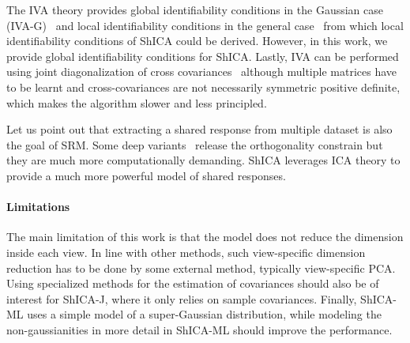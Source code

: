 
The IVA theory provides global identifiability conditions in the Gaussian case (IVA-G)~\cite{via2011joint} and local identifiability conditions in the general case~\cite{anderson2014independent} from which local identifiability conditions of ShICA could be derived. However, in this work, we provide global identifiability conditions for ShICA.
Lastly, IVA can be performed using joint diagonalization of cross covariances~\cite{li2011joint, congedo2012orthogonal} although multiple matrices have to be learnt and cross-covariances are not necessarily symmetric positive definite, which makes the algorithm slower and less principled.

Let us point out that extracting a shared response from multiple dataset is also
the goal of SRM. Some deep variants~\cite{chen2016convolutional} release the
orthogonality constrain but they are much more computationally demanding.
ShICA leverages ICA theory to provide a much more powerful model of shared responses.


\paragraph{Limitations}
The main limitation of this work is that the model does not reduce the dimension inside each view. In line with other methods, such view-specific  dimension reduction has to be done by some external method, typically view-specific PCA. Using specialized methods for the estimation of covariances should also be of interest for ShICA-J, where it only relies on sample covariances. Finally, ShICA-ML uses a simple model of a super-Gaussian distribution, while modeling the non-gaussianities in more detail in ShICA-ML should improve the performance.

